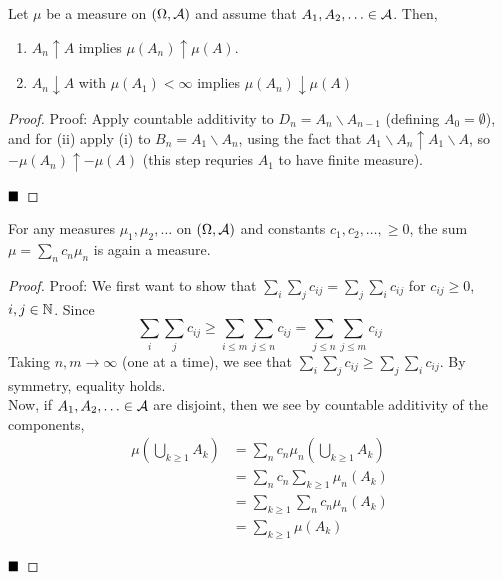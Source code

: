 \begin{lemma}
    Let $\mu$ be a measure on $(\Omega, \cal{A})$ and assume that $A_1, A_2, \ldots \in \cal{A}$. Then, 
    \begin{enumerate}
        \item $A_n \uparrow A$ implies $\mu(A_n) \uparrow \mu(A)$.
        \item $A_n \downarrow A$ with $\mu(A_1) < \infty$ implies $\mu(A_n) \downarrow \mu(A)$
    \end{enumerate}
\end{lemma}
\begin{proof}{Proof:}
    Apply countable additivity to $D_n = A_n \backslash A_{n - 1}$ (defining $A_0 = \emptyset$), and for (ii) apply (i) to $B_n = A_1 \backslash A_n$, using the fact that $A_1 \backslash A_n \uparrow A_1 \backslash A$, so $-\mu(A_n) \uparrow -\mu(A)$ (this step requries $A_1$ to have finite measure).

    $\qed$
\end{proof}

\begin{lemma}
    For any measures $\mu_1, \mu_2, \ldots$ on $(\Omega, \cal{A})$ and constants $c_1, c_2, \ldots, \geq 0$, the sum $\mu = \sum_{n} c_n\mu_n$ is again a measure.
\end{lemma}
\begin{proof}{Proof:}
    We first want to show that $\sum_{i} \sum_{j} c_{ij} = \sum_{j}\sum_{i} c_{ij}$ for $c_{ij} \geq 0$, $i, j \in \N$. Since
    \[ \sum_{i}\sum_{j} c_{ij} \geq \sum_{i \leq m}\sum_{j \leq n} c_{ij} = \sum_{j \leq n}\sum_{j \leq m} c_{ij} \]
    Taking $n, m \to \infty$ (one at a time), we see that $\sum_{i}\sum_{j}c_{ij} \geq \sum_{j}\sum_{i}c_{ij}$. By symmetry, equality holds.\\

    Now, if $A_1, A_2, \ldots \in \cal{A}$ are disjoint, then we see by countable additivity of the components, 
    \begin{align*}
        \mu\left(\bigcup_{k \geq 1} A_k\right) &= \sum_{n} c_n\mu_{n}\left(\bigcup_{k \geq 1}A_{k}\right)\\
        &= \sum_{n} c_n \sum_{k \geq 1} \mu_{n}(A_k)\\
        &= \sum_{k \geq 1} \sum_{n} c_n\mu_{n}(A_k)\\
        &= \sum_{k \geq 1} \mu(A_k)
    \end{align*}

    $\qed$
\end{proof}